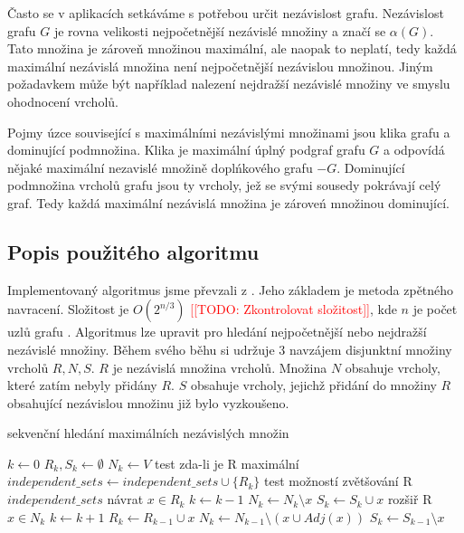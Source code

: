 \documentclass[12pt]{article}
\newcommand{\todo}[1]{\textcolor{red}{[[TODO: #1]]}}
\begin{document}
Často se v aplikacích  setkáváme s potřebou určit nezávislost grafu. Nezávislost grafu \(G\) je rovna velikosti nejpočetnější nezávislé množiny a značí se \(\alpha(G)\). Tato množina je zároveň množinou maximální, ale naopak to neplatí, tedy každá maximální nezávislá množina není nejpočetnější nezávislou množinou. Jiným požadavkem může být například nalezení nejdražší nezávislé množiny ve smyslu ohodnocení vrcholů.

Pojmy úzce související s maximálními nezávislými množinami jsou klika grafu a dominující podmnožina. Klika je maximální úplný podgraf grafu \(G\) a odpovídá nějaké maximální nezavislé množině doplńkového grafu \(-G\). Dominující podmnožina vrcholů grafu jsou ty vrcholy, jež se svými sousedy pokrávají celý graf. Tedy každá maximální nezávislá množina je zároveń množinou dominující.

\subsection{Popis použitého algoritmu}
Implementovaný algoritmus jsme převzali z \cite{demel}. Jeho základem je metoda zpětného navracení. Složitost je \(O(2^{n/3})\) \todo{Zkontrolovat složitost}, kde \(n\) je počet uzlů grafu \cite{tarjan}. Algoritmus lze upravit pro hledání nejpočetnější nebo nejdražší nezávislé množiny. Během svého běhu si udržuje 3 navzájem disjunktní množiny vrcholů \(R, N, S\). \(R\) je nezávislá množina vrcholů. Množina \(N\) obsahuje vrcholy, které zatím nebyly přidány \(R\). \(S\) obsahuje vrcholy, jejichž přidání do množiny $R$ obsahující nezávislou množinu již bylo vyzkoušeno.

\begin{algorithm}[H]
\caption{sekvenční hledání maximálních nezávislých množin}
\label{seq_independent_sets}
\begin{algorithmic}
\State $k \leftarrow 0$
\State $R_k, S_k \leftarrow \emptyset$
\State $N_k \leftarrow V$
  \State \Comment test zda-li je R maximální                           
    \State $independent\_sets \leftarrow independent\_sets \cup \{R_k\}$
  \EndIf    
  \State \Comment test možností zvětšování R
      \State \Return $independent\_sets$
    \EndIf
    \State \Comment návrat
    \State $x \in R_k$
    \State $k \leftarrow k - 1$
    \State $N_k \leftarrow N_k \setminus {x}$
    \State $S_k \leftarrow S_k \cup {x}$   
  \Else
    \State \Comment rozšiř R
    \State $x \in N_k$
    \State $k \leftarrow k+1$
    \State $R_k \leftarrow R_{k-1} \cup {x}$    
    \State $N_k \leftarrow N_{k-1} \setminus ({x} \cup Adj(x))$
    \State $S_k \leftarrow S_{k-1} \setminus {x}$     
  \EndIf
\EndWhile
\EndFunction
\end{algorithmic}
\end{algorithm}
\end{document}
